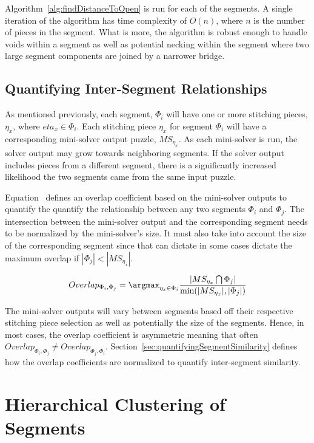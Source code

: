 Algorithm~\ref{alg:findDistanceToOpen} is run for each of the segments.  A single iteration of the algorithm has time complexity of $O(n)$, where $n$ is the number of pieces in the segment.  What is more, the algorithm is robust enough to handle voids within a segment as well as potential necking within the segment where two large segment components are joined by a narrower bridge.


\subsection{Quantifying Inter-Segment Relationships}

As mentioned previously, each segment, $\Phi_i$ will have one or more stitching pieces, $\eta_x$, where $eta_x \in \Phi_i$.  Each stitching piece $\eta_x$ for segment $\Phi_i$ will have a corresponding mini-solver output puzzle, $MS_{\eta_x}$.  As each mini-solver is run, the solver output may grow towards neighboring segments.  If the solver output includes pieces from a different segment, there is a significantly increased likelihood the two segments came from the same input puzzle. 

Equation~ defines an overlap coefficient based on the mini-solver outputs to quantify the quantify the relationship between any two segments $\Phi_i$ and $\Phi_j$. The intersection between the mini-solver output and the corresponding segment needs to be normalized by the mini-solver's size.  It must also take into account the size of the corresponding segment since that can dictate in some cases dictate the maximum overlap if $|\Phi_j| < |MS_{\eta_x}|$.

\begin{equation} \label{eq:segmentSimilarity}
Overlap_{\Phi_i,\Phi_j} = \argmax_{\eta_x \in \Phi_i} {\frac{|MS_{\eta_x} \bigcap \Phi_j|}{\text{min}(|MS_{\eta_x}|, |\Phi_j|)}}
\end{equation}

The mini-solver outputs will vary between segments based off their respective stitching piece selection as well as potentially the size of the segments.  Hence, in most cases, the overlap coefficient is asymmetric meaning that often $Overlap_{\Phi_i,\Phi_j} \neq Overlap_{\Phi_j,\Phi_i}$.  Section~\ref{sec:quantifyingSegmentSimilarity} defines how the overlap coefficients are normalized to quantify inter-segment similarity.

\section{Hierarchical Clustering of Segments}

